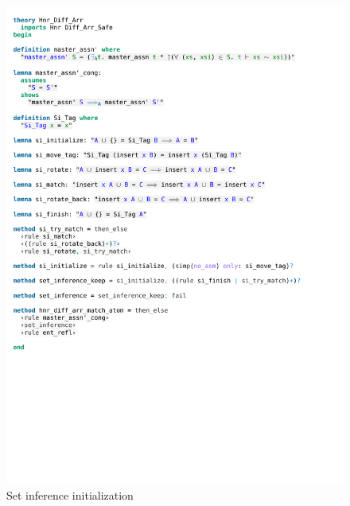\begin{figure}[htpb]
    \includegraphics[trim={0 21cm 0 6,8cm}, clip, width=1.00\textwidth]{figures/Theory_Hnr_Diff_Arr_SI.pdf}
    \caption[Set inference initialization]{Set inference initialization}
    \label{fig:si_init}
\end{figure}

